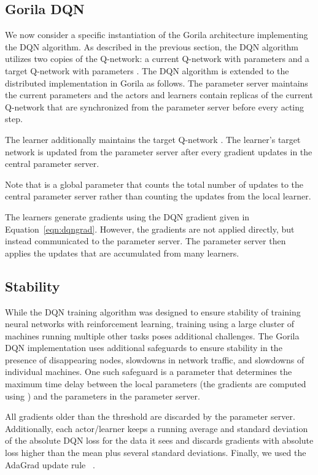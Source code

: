 \documentclass{article}
\begin{document}
\subsection{Gorila DQN}

We now consider a specific instantiation of the Gorila architecture implementing the DQN algorithm.
As described in the previous section, the DQN algorithm utilizes two copies of the Q-network: a current Q-network with parameters  and a target Q-network with parameters .
The DQN algorithm is extended to the distributed implementation in Gorila as follows.
The parameter server maintains the current parameters  and the actors and learners contain replicas of the current Q-network  that are synchronized from the parameter server before every acting step.

The learner additionally maintains the target Q-network .
The learner's target network is updated from the parameter server  after every  gradient updates in the central parameter server.

Note that  is a global parameter that counts the total number of updates to the central parameter server rather than counting the updates from the local learner.

The learners generate gradients using the DQN gradient given in Equation~\ref{eqn:dqngrad}. However, the gradients are not applied directly, but instead communicated to the parameter server. The parameter server then applies the updates that are accumulated from many learners.

\subsection{Stability}
While the DQN training algorithm was designed to ensure stability of training neural networks with reinforcement learning, training using a large cluster of machines running multiple other tasks poses additional challenges.
The Gorila DQN implementation uses additional safeguards to ensure stability in the presence of disappearing nodes, slowdowns in network traffic, and slowdowns of individual machines.
One such safeguard is a parameter that determines the maximum time delay between the local parameters  (the gradients  are computed using ) and the parameters  in the parameter server.

All gradients older than the threshold are discarded by the parameter server.  Additionally, each actor/learner keeps a running average and standard deviation of the absolute DQN loss for the data it sees and discards gradients with absolute loss higher than the mean plus several standard deviations.  Finally, we used the AdaGrad update rule ~\cite{duchi2011adaptive}.
\end{document}
